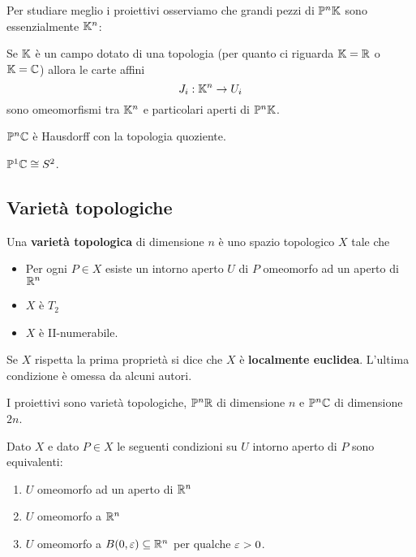\begin{multicols*}{2}
\noindent
Per studiare meglio i proiettivi osserviamo che grandi pezzi di $\mathbb{P}^n\mathbb{K}$ sono essenzialmente $\mathbb{K}^n$:
\begin{proposition}\label{CarteAffiniSonoOmeomorfismi}
Se $\mathbb{K}$ \`e un campo dotato di una topologia (per quanto ci riguarda $\mathbb{K}=\mathbb{R}$ o $\mathbb{K}=\mathbb{C}$) allora le carte affini
\[J_i:\mathbb{K}^n\to U_i\]
sono omeomorfismi tra $\mathbb{K}^n$ e particolari aperti di $\mathbb{P}^n\mathbb{K}$.
\end{proposition}

\begin{proposition}
$\mathbb{P}^n\mathbb{C}$ \`e Hausdorff con la topologia quoziente.
\end{proposition}


\begin{corollary}
$\mathbb{P}^1\mathbb{C}\cong S^2$.
\end{corollary}

\subsection{Variet\`a topologiche}
\begin{definition}
Una \textbf{variet\`a topologica} di dimensione $n$ \`e uno spazio topologico $X$ tale che
\begin{itemize}[noitemsep]
\item Per ogni $P\in X$ esiste un intorno aperto $U$ di $P$ omeomorfo ad un aperto di $\mathbb{R}^n$
\item $X$ \`e $T_2$
\item $X$ \`e II-numerabile.
\end{itemize}
\end{definition}
\begin{remark}
Se $X$ rispetta la prima propriet\`a si dice che $X$ \`e \textbf{localmente euclidea}. L'ultima condizione \`e omessa da alcuni autori.
\end{remark}

\begin{remark}
I proiettivi sono variet\`a topologiche, $\mathbb{P}^n\mathbb{R}$ di dimensione $n$ e $\mathbb{P}^n\mathbb{C}$ di dimensione $2n$.
\end{remark}

\begin{proposition}
Dato $X$ e dato $P\in X$ le seguenti condizioni su $U$ intorno aperto di $P$ sono equivalenti:
\begin{enumerate}[noitemsep]
\item $U$ omeomorfo ad un aperto di $\mathbb{R}^n$
\item $U$ omeomorfo a $\mathbb{R}^n$
\item $U$ omeomorfo a $B(0,\varepsilon)\subseteq \mathbb{R}^n$ per qualche $\varepsilon>0$.
\end{enumerate}
\end{proposition}


\end{multicols*}
